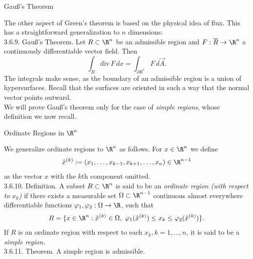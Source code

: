 \documentclass[smaller,hyperref={CJKbookmarks=true}]{beamer}
\begin{document}
\begin{frame}[c]{Gau\ss's Theorem}
\begin{spacing}{1.05}
The other aspect of Green's theorem is based on the physical idea of flux.
This has a straightforward generalization to $n$ dimensions:\\[5pt]
\alert{3.6.9. Gau\ss's Theorem.} Let $R\subset\R^n$ be an admissible region and $F:\overline{R}\to\R^n$ a continuously dif{}ferentiable vector field. Then
\[\int_R\text{div}\,F\,dx=\int_{\partial R^*}F\,d\vec{A}.\]
The integrals make sense, as the boundary of an admissible region is a
union of hypersurfaces. Recall that the surfaces are oriented in such a way
that the normal vector points outward.\\[6pt]
We will prove Gau\ss's theorem only for the case of \emph{simple regions}, whose
definition we now recall.
\end{spacing}
\end{frame}
\begin{frame}[t]{Ordinate Regions in $\R^n$}
\begin{spacing}{1}
We generalize ordinate regions to $\R^n$ as follows. For $x\in\R^n$ we define
\[\hat{x}^{(k)}:=(x_1,\ldots,x_{k-1},x_{k+1},\ldots,
x_n)\in\R^{n-1}\]
as the vector $x$ with the $k$th component omitted.\\[8pt]
\alert{3.6.10. Definition.} A subset $R\subset\R^n$ is said to be an \emph{ordinate region (with respect to $x_k$)} if there exists a measurable set $\Omega\subset\R^{n-1}$ continuous almost everywhere dif{}ferentiable functions $\varphi_1,\varphi_2:\Omega\to\R$, such that
\[R=\{x\in\R^n:\hat{x}^{(k)}\in\Omega,\,\,
\varphi_1(\hat{x}^{(k)})\leq x_k\leq\varphi_2(\hat{x}^{(k)})\}.\]
If $R$ is an ordinate region with respect to each $x_k,k=1,\ldots,n$, it is said to be a \emph{simple region.}\\[10pt]
\alert{3.6.11. Theorem.} A simple region is admissible.
\end{spacing}
\end{frame}
\end{document}
